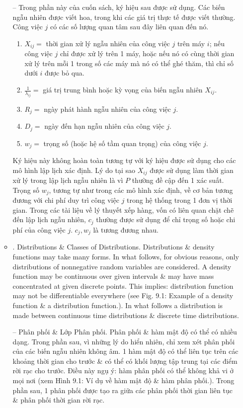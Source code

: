 \documentclass{article}
\begin{document}
\begin{itemize}
\begin{itemize}
        -- Trong phần này của cuốn sách, ký hiệu sau được sử dụng. Các biến ngẫu nhiên được viết hoa, trong khi các giá trị thực tế được viết thường. Công việc $j$ có các số lượng quan tâm sau đây liên quan đến nó.
        \begin{enumerate}
            \item $X_{ij} =$ thời gian xử lý ngẫu nhiên của công việc $j$ trên máy $i$; nếu công việc $j$ chỉ được xử lý trên 1 máy, hoặc nếu nó có cùng thời gian xử lý trên mỗi 1 trong số các máy mà nó có thể ghé thăm, thì chỉ số dưới $i$ được bỏ qua.
            \item $\frac{1}{\lambda_{ij}} =$ giá trị trung bình hoặc kỳ vọng của biến ngẫu nhiên $X_{ij}$.
            \item $R_j =$ ngày phát hành ngẫu nhiên của công việc $j$.
            \item $D_j =$ ngày đến hạn ngẫu nhiên của công việc $j$.
            \item $w_j =$ trọng số (hoặc hệ số tầm quan trọng) của công việc $j$.
        \end{enumerate}
        Ký hiệu này không hoàn toàn tương tự với ký hiệu được sử dụng cho các mô hình lập lịch xác định. Lý do tại sao $X_{ij}$ được sử dụng làm thời gian xử lý trong lập lịch ngẫu nhiên là vì $P$ thường đề cập đến 1 xác suất. Trọng số $w_j$, tương tự như trong các mô hình xác định, về cơ bản tương đương với chi phí duy trì công việc $j$ trong hệ thống trong 1 đơn vị thời gian. Trong các tài liệu về lý thuyết xếp hàng, vốn có liên quan chặt chẽ đến lập lịch ngẫu nhiên, $c_j$ thường được sử dụng để chỉ trọng số hoặc chi phí của công việc $j$. $c_j,w_j$ là tương đương nhau.
        \item {. Distributions \& Classes of Distributions.} Distributions \&  density functions may take many forms. In what follows, for obvious reasons, only distributions of nonnegative random variables are considered. A density function may be continuous over given intervals \& may have mass concentrated at given discrete points. This implies: distribution function may not be differentiable everywhere (see {\sf Fig. 9.1: Example of a density function \& a distribution function.}). In what follows a distribution is made between continuous time distributions \& discrete time distributions.

        -- {\sf Phân phối \& Lớp Phân phối.} Phân phối \& hàm mật độ có thể có nhiều dạng. Trong phần sau, vì những lý do hiển nhiên, chỉ xem xét phân phối của các biến ngẫu nhiên không âm. 1 hàm mật độ có thể liên tục trên các khoảng thời gian cho trước \& có thể có khối lượng tập trung tại các điểm rời rạc cho trước. Điều này ngụ ý: hàm phân phối có thể không khả vi ở mọi nơi (xem {\sf Hình 9.1: Ví dụ về hàm mật độ \& hàm phân phối.}). Trong phần sau, 1 phân phối được tạo ra giữa các phân phối thời gian liên tục \& phân phối thời gian rời rạc.


\end{itemize}
\end{itemize}
\end{document}
